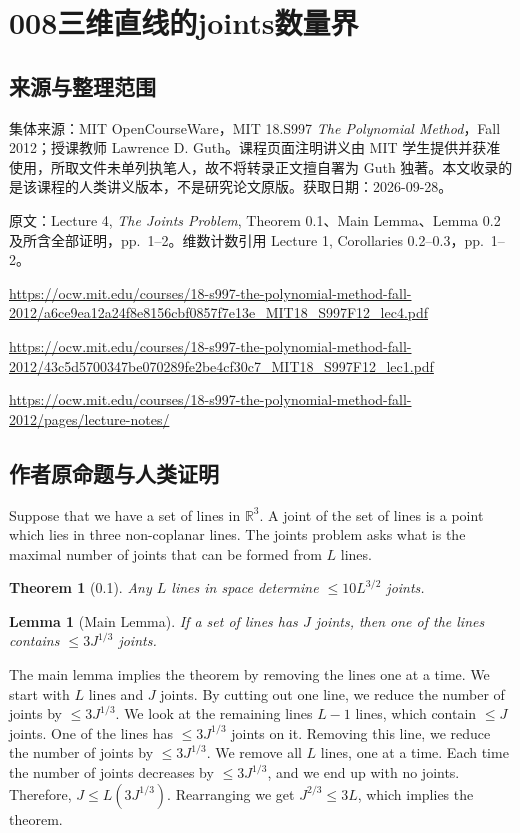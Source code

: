 \documentclass[UTF8,11pt]{ctexart}
\newtheorem*{theorem}{Theorem}
\newtheorem*{lemma}{Lemma}
\begin{document}
\section*{008\quad 三维直线的joints数量界}
\subsection*{来源与整理范围}
集体来源：MIT OpenCourseWare，MIT 18.S997 \emph{The Polynomial Method}，Fall 2012；授课教师 Lawrence D. Guth。课程页面注明讲义由 MIT 学生提供并获准使用，所取文件未单列执笔人，故不将转录正文擅自署为 Guth 独著。本文收录的是该课程的人类讲义版本，不是研究论文原版。获取日期：2026-09-28。\par 原文：Lecture 4, \emph{The Joints Problem}, Theorem 0.1、Main Lemma、Lemma 0.2 及所含全部证明，pp.~1--2。维数计数引用 Lecture 1, Corollaries 0.2--0.3，pp.~1--2。
\par\url{https://ocw.mit.edu/courses/18-s997-the-polynomial-method-fall-2012/a6ce9ea12a24f8e8156cbf0857f7e13e_MIT18_S997F12_lec4.pdf}
\par\url{https://ocw.mit.edu/courses/18-s997-the-polynomial-method-fall-2012/43c5d5700347be070289fe2be4cf30c7_MIT18_S997F12_lec1.pdf}
\par\url{https://ocw.mit.edu/courses/18-s997-the-polynomial-method-fall-2012/pages/lecture-notes/}

\subsection*{作者原命题与人类证明}
Suppose that we have a set of lines in $\mathbb R^3$. A joint of the set of lines is a point which lies in three non-coplanar lines. The joints problem asks what is the maximal number of joints that can be formed from $L$ lines.

\begin{theorem}[0.1]
Any $L$ lines in space determine $\leq 10L^{3/2}$ joints.
\end{theorem}
\begin{lemma}[Main Lemma]
If a set of lines has $J$ joints, then one of the lines contains $\leq 3J^{1/3}$ joints.
\end{lemma}
The main lemma implies the theorem by removing the lines one at a time. We start with $L$ lines and $J$ joints. By cutting out one line, we reduce the number of joints by $\leq 3J^{1/3}$. We look at the remaining lines $L-1$ lines, which contain $\leq J$ joints. One of the lines has $\leq 3J^{1/3}$ joints on it. Removing this line, we reduce the number of joints by $\leq 3J^{1/3}$. We remove all $L$ lines, one at a time. Each time the number of joints decreases by $\leq 3J^{1/3}$, and we end up with no joints. Therefore, $J\leq L(3J^{1/3})$. Rearranging we get $J^{2/3}\leq 3L$, which implies the theorem.
\end{document}
